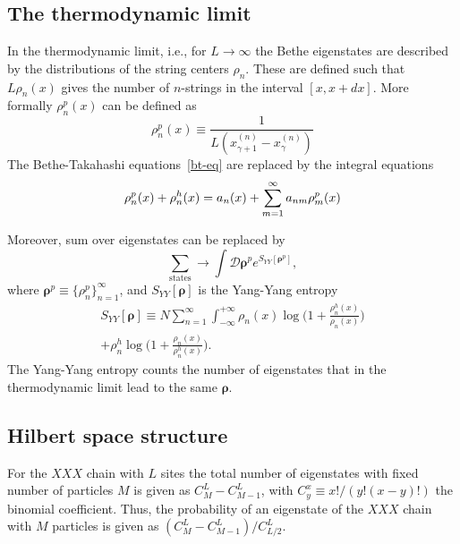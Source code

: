 \documentclass[twocolumn,superscriptaddress,prb,10pt]{revtex4-1}
\begin{document}
\subsection{The thermodynamic limit}

In the thermodynamic limit, i.e., for $L\to\infty$ the Bethe eigenstates are 
described by the distributions of the string centers $\rho_n$. 
These are defined such that $L\rho_n(x)$ gives the number of $n$-strings in the 
interval $[x,x+dx]$. More formally $\rho^p_n(x)$ can be defined as 
%
\begin{equation}
\label{rho-n}
\rho^p_n(x)\equiv\frac{1}{L(x_{\gamma+1}^{(n)}-x_\gamma^{(n)})}
\end{equation}
%
The Bethe-Takahashi equations~\eqref{bt-eq} are replaced by the integral 
equations 
%
\begin{equation}
\rho^p_n(x)+\rho_n^h(x)=a_n(x)+\sum\limits_{m=1}^\infty a_{nm}\*\rho^p_m(x)
\end{equation}
%

Moreover, sum over eigenstates can be replaced by 
%
\begin{equation}
\sum\limits_{\textrm{states}}\rightarrow\int{\mathcal D}
\pmb{\rho}^pe^{S_{YY}[\pmb{\rho}^p]},
\end{equation}
%
where $\pmb{\rho}^p\equiv\{\rho^p_n\}_{n=1}^\infty$, and $S_{YY}[\pmb{\rho}]$ 
is the Yang-Yang entropy
%
\begin{multline}
S_{YY}[\pmb{\rho}]\equiv N\sum\limits_{n=1}^\infty\int_{-\infty}^{+\infty}
\rho_n(x)\log\Big(1+\frac{\rho_n^h(x)}{\rho_n(x)}\Big)\\
+\rho_n^h\log\Big(1+\frac{\rho_n(x)}{\rho_n^h(x)}\Big).
\end{multline}
%
The Yang-Yang entropy counts the number of eigenstates that in the 
thermodynamic limit lead to the same $\pmb{\rho}$. 




\subsection{Hilbert space structure}


For the $XXX$ chain with $L$ sites the total number of eigenstates with 
fixed number of particles $M$ is given as $C_M^L-C_{M-1}^L$, with 
$C_y^x\equiv x!/(y!(x-y)!)$ the binomial coefficient. Thus, the probability 
of an eigenstate of the $XXX$ chain with $M$ particles is given as 
$(C_M^L-C_{M-1}^L)/C_{L/2}^L$. 
\end{document}
